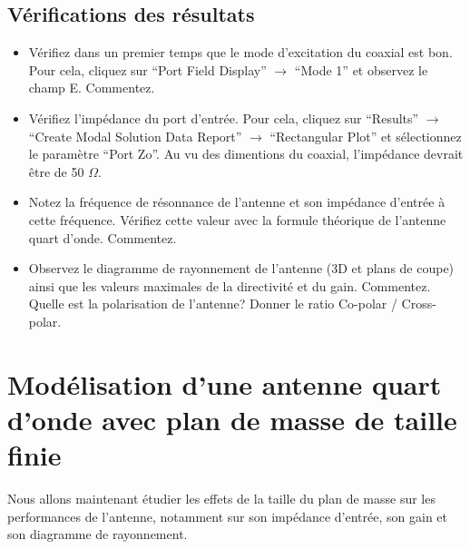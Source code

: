 \subsection{Vérifications des résultats}

\begin{itemize}
    \item Vérifiez dans un premier temps que le mode d'excitation du coaxial est bon. Pour cela, cliquez sur ``Port Field Display'' $\rightarrow$ ``Mode 1'' et observez le champ E. Commentez.
    
    \item Vérifiez l'impédance du port d'entrée. Pour cela, cliquez sur ``Results'' $\rightarrow$ ``Create Modal Solution Data Report'' $\rightarrow$ ``Rectangular Plot'' et sélectionnez le paramètre ``Port Zo''. Au vu des dimentions du coaxial, l'impédance devrait être de 50 $\Omega$.
    
    \item Notez la fréquence de résonnance de l'antenne et son impédance d'entrée à cette fréquence. Vérifiez cette valeur avec la formule théorique de l'antenne quart d'onde. Commentez.
    
    \item Observez le diagramme de rayonnement de l'antenne (3D et plans de coupe) ainsi que les valeurs maximales de la directivité et du gain. Commentez. Quelle est la polarisation de l'antenne? Donner le ratio Co-polar / Cross-polar.
    

\end{itemize}

\section{Modélisation d'une antenne quart d'onde avec plan de masse de taille finie}

Nous allons maintenant étudier les effets de la taille du plan de masse sur les performances de l'antenne, notamment sur son impédance d'entrée, son gain et son diagramme de rayonnement.

